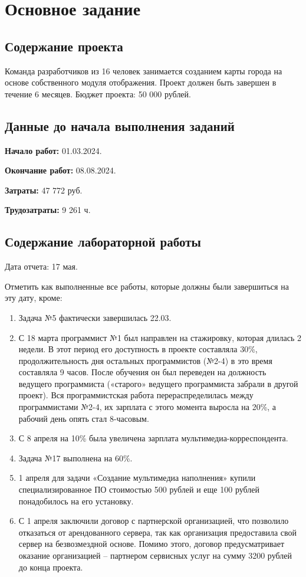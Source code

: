 \chapter{Основное задание}

\section{Содержание проекта}

Команда разработчиков из 16 человек занимается созданием карты города на основе собственного модуля отображения. Проект должен быть завершен в течение 6 месяцев. Бюджет проекта: 50 000 рублей.

\section{Данные до начала выполнения заданий}

\textbf{Начало работ:} 01.03.2024. 

\textbf{Окончание работ:} 08.08.2024.

\textbf{Затраты:} 47 772 руб.

\textbf{Трудозатраты:} 9 261 ч.

\section{Содержание лабораторной работы}

Дата отчета: 17 мая.

Отметить как выполненные все работы, которые должны были завершиться на эту дату, кроме:

\begin{enumerate}
	\item Задача №5 фактически завершилась 22.03.
	\item С 18 марта программист №1 был направлен на стажировку, которая длилась 2 недели. В этот период его доступность в проекте составляла 30\%, продолжительность дня остальных программистов (№2-4) в это время составляла 9 часов. После обучения он был переведен на должность ведущего программиста («старого» ведущего программиста забрали в другой проект). Вся программистская работа перераспределилась между программистами №2-4, их зарплата с этого момента выросла на 20\%, а рабочий день опять стал 8-часовым.
	\item С 8 апреля на 10\% была увеличена зарплата мультимедиа-корреспондента.
	\item Задача №17 выполнена на 60\%.
	\item 1 апреля для задачи «Создание мультимедиа наполнения» купили специализированное ПО стоимостью 500 рублей и еще 100 рублей понадобилось на его установку.
	\item С 1 апреля заключили договор с партнерской организацией, что позволило отказаться от арендованного сервера, так как организация предоставила свой сервер на безвозмездной основе. Помимо этого, договор предусматривает оказание организацией – партнером сервисных услуг на сумму 3200 рублей до конца проекта.
\end{enumerate}

